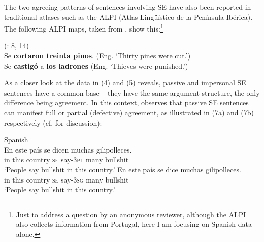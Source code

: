 \documentclass[output=paper]{langsci/langscibook}
\begin{document}
The two agreeing patterns of sentences involving SE have also been reported in traditional atlases such as the ALPI (Atlas Lingüístico de la Península Ibérica). The following ALPI maps, taken from \citet{Benito2010}, show this:\footnote{Just to address a question by an anonymous reviewer, although the ALPI also collects information from Portugal, here I am focusing on Spanish data alone.} 

\ea%
    (\citealt{Benito2010}: 8, 14)
    \label{ex:gallego:6}\\
    \ea Se \textbf{cortaron treinta pinos}. (Eng. ‘Thirty pines were cut.’)\\
    \ex Se \textbf{castigó} a \textbf{los ladrones} (Eng. ‘Thieves were punished.’)\\
    \z
\z

As a closer look at the data in (4) and (5) reveals, passive and impersonal SE sentences have a common base – they have the same argument structure, the only difference being agreement. In this context, \citet[§26.3.2.2]{Mendikoetxea1999} observes that passive SE sentences can manifest full or partial (defective) agreement, as illustrated in (7a) and (7b) respectively (cf. \citealt{Martín1979} for discussion):

\ea%
    Spanish\label{ex:gallego:7}\\
    \ea
    \gll En  este  país        se   dicen       muchas  gilipolleces.       \\
         in   this   country  \textsc{se}  say\textsc{{}-3pl}  many     bullshit\\
    \glt ‘People say bullshit in this country.’
    \ex
    \gll En  este  país        se   dice        muchas  gilipolleces.       \\
         in   this   country  \textsc{se} say\textsc{{}-3sg}  many     bullshit \\
    \glt ‘People say bullshit in this country.’
    \z
\z
\end{document}
